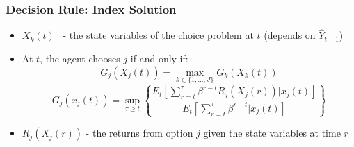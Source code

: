 \documentclass[aspectratio=169,11pt]{beamer}
\begin{document}

\begin{frame}[label=GITTINS]

\frametitle{Decision Rule: Index Solution}

\begin{itemize}
\item $X_{k}(t)$ \ - the state variables of the choice problem at $t$
(depends on $\widehat{Y}_{t-1}$)

\item At $t$, the agent chooses $j$ if and only if:%
\[
G_{j}(X_{j}(t))=\max_{k\in \{1,...,J\}}G_{k}(X_{k}(t)) 
\]%
\[
G_{j}(x_{j}(t))=\sup_{\tau \geq t}\left\{ \frac{E_{t}\left[ \sum_{r=t}^{\tau
}\beta ^{r-t}R_{j}(X_{j}(r))|x_{j}(t)\right] }{E_{t}\left[ \sum_{r=t}^{\tau
}\beta ^{r-t}|x_{j}(t)\right] }\right\} 
\]

\item $R_{j}(X_{j}(r))$ - the returns from option $j$ given the state
variables at time $r$
\end{itemize}

\hyperlink{DYNAM}{}
\end{frame}
\end{document}
